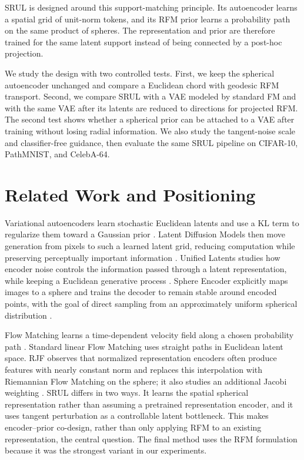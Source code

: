 \documentclass{article}
\begin{document}
SRUL is designed around this support-matching principle. Its autoencoder learns a spatial grid of unit-norm tokens, and its RFM prior learns a probability path on the same product of spheres. The representation and prior are therefore trained for the same latent support instead of being connected by a post-hoc projection.

We study the design with two controlled tests. First, we keep the spherical autoencoder unchanged and compare a Euclidean chord with geodesic RFM transport. Second, we compare SRUL with a VAE modeled by standard FM and with the same VAE after its latents are reduced to directions for projected RFM. The second test shows whether a spherical prior can be attached to a VAE after training without losing radial information. We also study the tangent-noise scale and classifier-free guidance, then evaluate the same SRUL pipeline on CIFAR-10, PathMNIST, and CelebA-64.

\section{Related Work and Positioning}
Variational autoencoders learn stochastic Euclidean latents and use a KL term to regularize them toward a Gaussian prior \cite{vae}. Latent Diffusion Models then move generation from pixels to such a learned latent grid, reducing computation while preserving perceptually important information \cite{ldm}. Unified Latents studies how encoder noise controls the information passed through a latent representation, while keeping a Euclidean generative process \cite{ul}. Sphere Encoder explicitly maps images to a sphere and trains the decoder to remain stable around encoded points, with the goal of direct sampling from an approximately uniform spherical distribution \cite{sphere}.

Flow Matching learns a time-dependent velocity field along a chosen probability path \cite{fm}. Standard linear Flow Matching uses straight paths in Euclidean latent space. RJF observes that normalized representation encoders often produce features with nearly constant norm and replaces this interpolation with Riemannian Flow Matching on the sphere; it also studies an additional Jacobi weighting \cite{rjf}. SRUL differs in two ways. It learns the spatial spherical representation rather than assuming a pretrained representation encoder, and it uses tangent perturbation as a controllable latent bottleneck. This makes encoder--prior co-design, rather than only applying RFM to an existing representation, the central question. The final method uses the RFM formulation because it was the strongest variant in our experiments.
\end{document}
